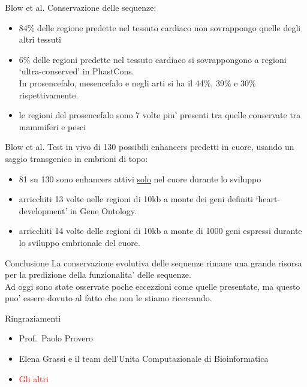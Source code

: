 \documentclass{beamer}
\newcommand{\warn}[1]{\textcolor{red}{#1}}
\begin{document}
    \begin{frame}[plain]{Blow et al.}
        Conservazione delle sequenze:
        \begin{itemize}
            \item 84\% delle regione predette nel tessuto cardiaco non sovrappongo quelle degli altri tessuti
            \item 6\% delle regioni predette nel tessuto cardiaco si sovrappongono a regioni `ultra-conserved'
            in PhastCons.\\
            In prosencefalo, mesencefalo e negli arti si ha il 44\%, 39\% e 30\% rispettivamente.
            \item le regioni del prosencefalo sono 7 volte piu' presenti tra quelle conservate
            tra mammiferi e pesci
        \end{itemize}
    \end{frame}


    \begin{frame}[plain]{Blow et al.}
        Test in vivo di 130 possibili enhancers predetti in cuore,
        usando un saggio transgenico in embrioni di topo:
        \begin{itemize}
            \item 81 su 130 sono enhancers attivi \underline{solo} nel cuore durante lo sviluppo
            \item arricchiti 13 volte nelle regioni di 10kb a monte dei geni definiti
            `heart-development' in Gene Ontology.
            \item arricchiti 14 volte delle regioni di 10kb a monte di 1000 geni espressi
            durante lo sviluppo embrionale del cuore.
        \end{itemize}
    \end{frame}


    \begin{frame}[plain]{Conclusione}
        La conservazione evolutiva delle sequenze rimane una grande risorsa
        per la predizione della funzionalita' delle sequenze.\\
        Ad oggi sono state osservate poche eccezzioni come quelle presentate,
        ma questo puo' essere dovuto al fatto che non le stiamo ricercando.\\
    \end{frame}

    \begin{frame}[plain]{Ringraziamenti}
        \begin{itemize}
            \item Prof.\ Paolo Provero
            \item Elena Grassi e il team dell'Unita Computazionale di Bioinformatica
            \item \warn{Gli altri}
        \end{itemize}
    \end{frame}
\end{document}
